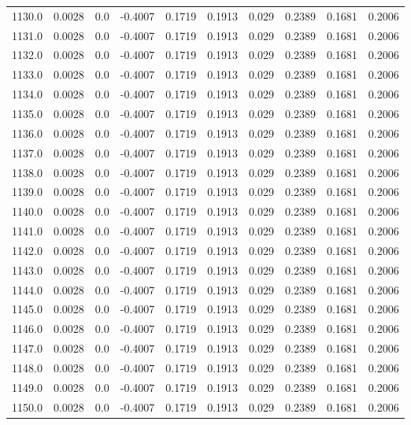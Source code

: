\begin{longtable}{lrrrrrrrrr}
1130.0 & 0.0028 & 0.0 & -0.4007 & 0.1719 & 0.1913 & 0.029 & 0.2389 & 0.1681 & 0.2006 \\
1131.0 & 0.0028 & 0.0 & -0.4007 & 0.1719 & 0.1913 & 0.029 & 0.2389 & 0.1681 & 0.2006 \\
1132.0 & 0.0028 & 0.0 & -0.4007 & 0.1719 & 0.1913 & 0.029 & 0.2389 & 0.1681 & 0.2006 \\
1133.0 & 0.0028 & 0.0 & -0.4007 & 0.1719 & 0.1913 & 0.029 & 0.2389 & 0.1681 & 0.2006 \\
1134.0 & 0.0028 & 0.0 & -0.4007 & 0.1719 & 0.1913 & 0.029 & 0.2389 & 0.1681 & 0.2006 \\
1135.0 & 0.0028 & 0.0 & -0.4007 & 0.1719 & 0.1913 & 0.029 & 0.2389 & 0.1681 & 0.2006 \\
1136.0 & 0.0028 & 0.0 & -0.4007 & 0.1719 & 0.1913 & 0.029 & 0.2389 & 0.1681 & 0.2006 \\
1137.0 & 0.0028 & 0.0 & -0.4007 & 0.1719 & 0.1913 & 0.029 & 0.2389 & 0.1681 & 0.2006 \\
1138.0 & 0.0028 & 0.0 & -0.4007 & 0.1719 & 0.1913 & 0.029 & 0.2389 & 0.1681 & 0.2006 \\
1139.0 & 0.0028 & 0.0 & -0.4007 & 0.1719 & 0.1913 & 0.029 & 0.2389 & 0.1681 & 0.2006 \\
1140.0 & 0.0028 & 0.0 & -0.4007 & 0.1719 & 0.1913 & 0.029 & 0.2389 & 0.1681 & 0.2006 \\
1141.0 & 0.0028 & 0.0 & -0.4007 & 0.1719 & 0.1913 & 0.029 & 0.2389 & 0.1681 & 0.2006 \\
1142.0 & 0.0028 & 0.0 & -0.4007 & 0.1719 & 0.1913 & 0.029 & 0.2389 & 0.1681 & 0.2006 \\
1143.0 & 0.0028 & 0.0 & -0.4007 & 0.1719 & 0.1913 & 0.029 & 0.2389 & 0.1681 & 0.2006 \\
1144.0 & 0.0028 & 0.0 & -0.4007 & 0.1719 & 0.1913 & 0.029 & 0.2389 & 0.1681 & 0.2006 \\
1145.0 & 0.0028 & 0.0 & -0.4007 & 0.1719 & 0.1913 & 0.029 & 0.2389 & 0.1681 & 0.2006 \\
1146.0 & 0.0028 & 0.0 & -0.4007 & 0.1719 & 0.1913 & 0.029 & 0.2389 & 0.1681 & 0.2006 \\
1147.0 & 0.0028 & 0.0 & -0.4007 & 0.1719 & 0.1913 & 0.029 & 0.2389 & 0.1681 & 0.2006 \\
1148.0 & 0.0028 & 0.0 & -0.4007 & 0.1719 & 0.1913 & 0.029 & 0.2389 & 0.1681 & 0.2006 \\
1149.0 & 0.0028 & 0.0 & -0.4007 & 0.1719 & 0.1913 & 0.029 & 0.2389 & 0.1681 & 0.2006 \\
1150.0 & 0.0028 & 0.0 & -0.4007 & 0.1719 & 0.1913 & 0.029 & 0.2389 & 0.1681 & 0.2006 \\

\end{longtable}

